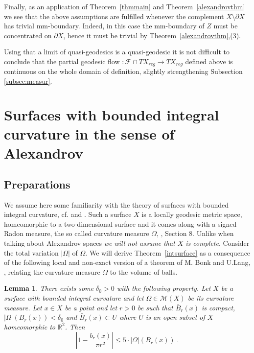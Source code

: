 \documentclass[12pt,leqno,intlimits]{amsart}
\numberwithin{equation}{section}
\newtheorem{lem}[thm]{Lemma}
\theoremstyle{definition}
\theoremstyle{remark}
\newcommand{\tref}[1]{Theorem~\ref{#1}}
\newcommand{\R}{\mathbb{R}}
\begin{document}
Finally, as an application of \tref{thmmain} and \tref{alexandrovthm} we see that the above assumptions are fulfilled whenever the complement $X\setminus \partial X$ has trivial mm-boundary. 
Indeed, in this case the mm-boundary of $Z$ must be concentrated on $\partial X$, hence it must be trivial by \tref{alexandrovthm},(3).

Using that a limit of quasi-geodesics is a quasi-geodesic it is not difficult to conclude that the partial geodesic flow $:\mathcal F\cap TX_{reg} \to TX_{reg}$ defined above is continuous on the whole domain of definition, slightly strengthening Subsection \ref{subsec:measur}.



\section{Surfaces with bounded integral curvature in the sense of Alexandrov} \label{sec:surface}
\subsection{Preparations} We assume here some  familiarity  with the theory of surfaces with bounded integral curvature, cf. \cite{AZ} and
 \cite{Reshetnyak-GeomIV}.  Such a surface $X$ is a locally geodesic metric space, homeomorphic to a two-dimensional surface and it comes along with a
signed Radon measure, the so called curvature measure $\Omega$, \cite{Reshetnyak-GeomIV}, Section 8. Unlike when talking about Alexandrov spaces \emph{we will not assume that $X$ is complete}.
 Consider the total variation $|\Omega |$ of $\Omega$.
 We will derive  \tref{intsurface} as a consequence of the following local and non-exact version of a theorem of M. Bonk and U.Lang, \cite{Bonk-Lang}, relating the curvature measure $\Omega$ to the volume of balls.

\begin{lem} \label{lem:bl}
There exists some $\delta _0>0$ with the following property.
Let $X$ be a surface with bounded integral curvature and let  $\Omega\in \mathcal M(X)$ be its   curvature measure. Let $x\in X$ be a point and let $r>0$ be such that
$\bar B_{r} (x)$ is compact,  $| \Omega| ( B_{r} (x) )  < \delta _0$ and $\bar B_{r} (x)\subset U$ where $U$ is an open subset of $X$ homeomorphic to $\R^2$.
Then $$|1- \frac {b_r(x)}  {\pi r^2} | \leq 5 \cdot |\Omega |( B_{r} (x)) \; .$$
\end{lem}
\end{document}
